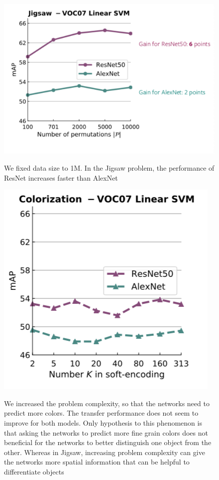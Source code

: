 \begin{figure}[htb!]
\centering
\includegraphics[width=0.8\linewidth]{lectures/14-b/graphics/jigsaw2.png}
\label{fig:jigsaw2}
\caption{We fixed data size to 1M. In the Jigsaw problem, the performance of ResNet increases faster than AlexNet}
\end{figure}

\begin{figure}[htb!]
\centering
\includegraphics[width=0.8\linewidth]{lectures/14-b/graphics/colorization2.png}
\label{fig:colorization2}
\caption{We increased the problem complexity, so that the networks need to predict more colors. The transfer performance does not seem to improve for both models. Only hypothesis to this phenomenon is that asking the networks to predict more fine grain colors does not beneficial for the networks to better distinguish one object from the other. Whereas in Jigsaw, increasing problem complexity can give the networks more spatial information that can be helpful to differentiate objects}
\end{figure}

